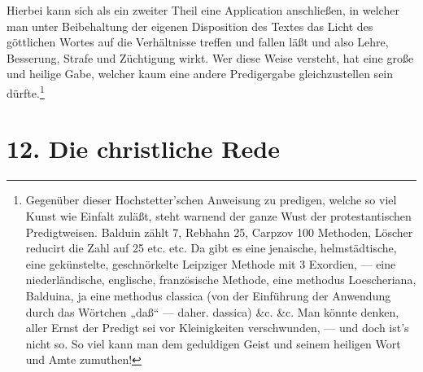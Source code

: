 Hierbei kann sich als ein zweiter Theil eine Application anschließen, in welcher man unter Beibehaltung der eigenen Disposition des Textes das Licht des göttlichen Wortes auf die Verhältnisse treffen und fallen läßt und also Lehre, Besserung, Strafe und Züchtigung wirkt. Wer diese Weise versteht, hat eine große und heilige Gabe, welcher kaum eine andere Predigergabe gleichzustellen sein dürfte.\footnote{Gegenüber dieser Hochstetter’schen Anweisung zu predigen, welche so viel Kunst wie Einfalt zuläßt, steht warnend der ganze Wust der protestantischen Predigtweisen. Balduin zählt 7, Rebhahn 25, Carpzov 100 Methoden, Löscher reducirt die Zahl auf 25 etc. etc. Da gibt es eine jenaische, helmstädtische, eine gekünstelte, geschnörkelte Leipziger Methode mit 3 Exordien, — eine niederländische, englische, französische Methode, eine methodus Loescheriana, Balduina, ja eine methodus classica (von der Einführung der Anwendung durch das Wörtchen „daß“ — daher. dassica) \&c. \&c. Man könnte denken, aller Ernst der Predigt sei vor Kleinigkeiten verschwunden, — und doch ist’s nicht so. So viel kann man dem geduldigen Geist und seinem heiligen Wort und Amte zumuthen!}

\section{12. Die christliche Rede}

